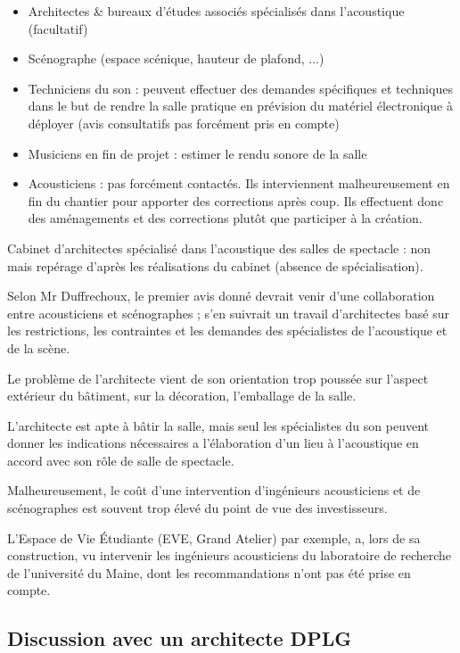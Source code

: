 \documentclass[a4paper, 11pt]{report}
\begin{document}
\begin{itemize}
\item Architectes \& bureaux d'études associés spécialisés dans l'acoustique (facultatif)
\item Scénographe (espace scénique, hauteur de plafond, ...)
\item Techniciens du son :  peuvent effectuer des demandes spécifiques et techniques dans le but de rendre la salle pratique en prévision du matériel électronique à déployer (avis consultatifs pas forcément pris en compte)
\item Musiciens en fin de projet : estimer le rendu sonore de la salle
\item Acousticiens : pas forcément contactés. Ils interviennent malheureusement en fin du chantier pour apporter des corrections après coup.  Ils effectuent donc des aménagements et des corrections plutôt que participer à la création.
\end{itemize}

Cabinet d'architectes spécialisé dans l'acoustique des salles de spectacle : non mais repérage d'après les réalisations du cabinet  (absence de spécialisation).

Selon Mr {\sc Duffrechoux}, le premier avis donné devrait venir d'une collaboration entre acousticiens et scénographes ; s'en suivrait un travail d'architectes basé sur les restrictions, les contraintes et les demandes des spécialistes de l'acoustique et de la scène.

Le problème de l'architecte vient de son orientation trop poussée sur l'aspect extérieur du bâtiment, sur la décoration, l'emballage de la salle.

L'architecte est apte à bâtir la salle, mais seul les spécialistes du son peuvent donner les indications nécessaires a l'élaboration d'un lieu à l'acoustique en accord avec son rôle de salle de spectacle.

Malheureusement, le coût d'une intervention d'ingénieurs acousticiens et de scénographes est souvent trop élevé du point de vue des investisseurs.


L'Espace de Vie Étudiante (EVE, Grand Atelier) par exemple, a, lors de sa construction, vu intervenir les ingénieurs acousticiens du laboratoire de recherche de l'université du Maine, dont les recommandations n'ont pas été prise en compte.

\subsection{Discussion avec un architecte DPLG}
\end{document}
